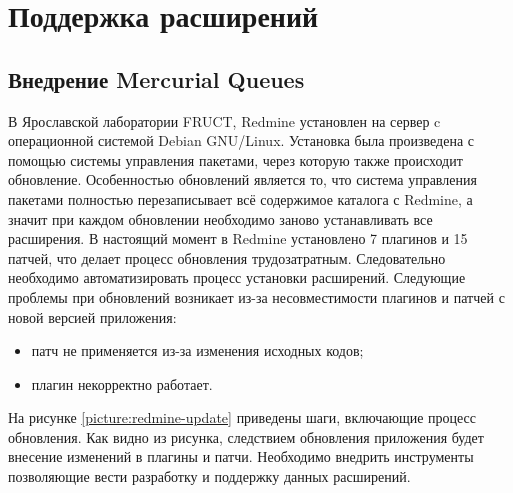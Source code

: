 \chapter{Поддержка расширений}
\section{Внедрение Mercurial Queues}
В Ярославской лаборатории FRUCT, Redmine установлен на сервер c операционной
системой Debian GNU/Linux. Установка была произведена с помощью системы
управления пакетами, через которую также происходит обновление. Особенностью обновлений
является то, что система управления пакетами полностью перезаписывает всё
содержимое каталога с Redmine, а значит при каждом обновлении необходимо заново
устанавливать все расширения. В настоящий момент в Redmine установлено 7
плагинов и 15 патчей, что делает процесс обновления трудозатратным.
Следовательно необходимо автоматизировать процесс установки расширений.
Следующие проблемы при обновлений возникает из-за несовместимости плагинов и
патчей с новой версией приложения:
\begin{itemize}
  \item патч не применяется из-за изменения исходных кодов;
  \item плагин некорректно работает.
\end{itemize}
На рисунке \ref{picture:redmine-update} приведены шаги, включающие процесс
обновления. Как видно из рисунка, следствием обновления приложения будет
внесение изменений в плагины и патчи. Необходимо внедрить инструменты
позволяющие вести разработку и поддержку данных расширений.


